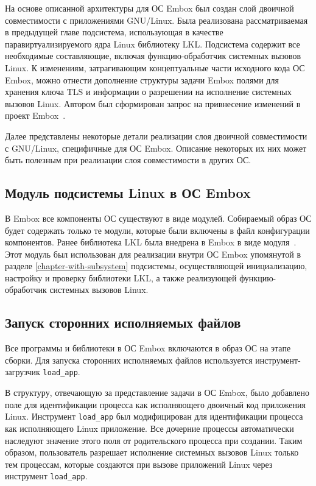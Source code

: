 
На основе описанной архитектуры для ОС Embox был создан слой двоичной совместимости с приложениями GNU/Linux. Была реализована рассматриваемая в предыдущей главе подсистема, использующая в качестве паравиртуализируемого ядра Linux библиотеку LKL. Подсистема содержит все необходимые составляющие, включая функцию-обработчик системных вызовов Linux. К изменениям, затрагивающим концептуальные части исходного кода ОС Embox, можно отнести дополнение структуры задачи Embox полями для хранения ключа TLS и информации о разрешении на исполнение системных вызовов Linux. Автором был сформирован запрос на привнесение изменений в проект Embox~\cite{pull-request}.

Далее представлены некоторые детали реализации слоя двоичной совместимости с GNU/Linux, специфичные для ОС Embox. Описание некоторых их них может быть полезным при реализации слоя совместимости в других ОС.


\subsection{Модуль подсистемы Linux в ОС Embox}

В Embox все компоненты ОС существуют в виде модулей. Собираемый образ ОС будет содержать только те модули, которые были включены в файл конфигурации компонентов. Ранее библиотека LKL была внедрена в Embox в виде модуля~\cite{lkl-in-embox-patch}. Этот модуль был использован для реализации внутри ОС Embox упомянутой в разделе \ref{chapter-with-subsystem} подсистемы, осуществляющей инициализацию, настройку и проверку библиотеки LKL, а также реализующей функцию-обработчик системных вызовов Linux.


\subsection{Запуск сторонних исполняемых файлов}

Все программы и библиотеки в ОС Embox включаются в образ ОС на этапе сборки. Для запуска сторонних исполняемых файлов используется инструмент-загрузчик \texttt{load\_app}.

В структуру, отвечающую за представление задачи в ОС Embox, было добавлено поле для идентификации процесса как исполняющего двоичный код приложения Linux. Инструмент \texttt{load\_app} был модифицирован для идентификации процесса как исполняющего Linux приложение. Все дочерние процессы автоматически наследуют значение этого поля от родительского процесса при создании. Таким образом, пользователь разрешает исполнение системных вызовов Linux только тем процессам, которые создаются при вызове приложений Linux через инструмент \texttt{load\_app}.

